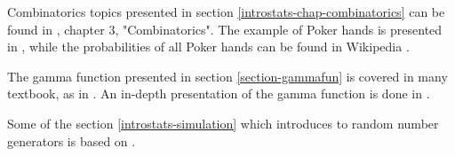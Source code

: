 Combinatorics topics presented in section \ref{introstats-chap-combinatorics} 
can be found in \cite{introprobasGrinsteadSnell}, chapter 3, "Combinatorics".
The example of Poker hands is presented in \cite{introprobasGrinsteadSnell},
while the probabilities of all Poker hands can be found in 
Wikipedia \cite{wiki:pokerprobas}.

The gamma function presented in section \ref{section-gammafun} is covered
in many textbook, as in \cite{AbramowitzStegun1972}. An in-depth presentation of 
the gamma function is done in \cite{SebahGourdon2002}.

Some of the section \ref{introstats-simulation} which introduces
to random number generators is based on \cite{artcomputerKnuthVol2}.







